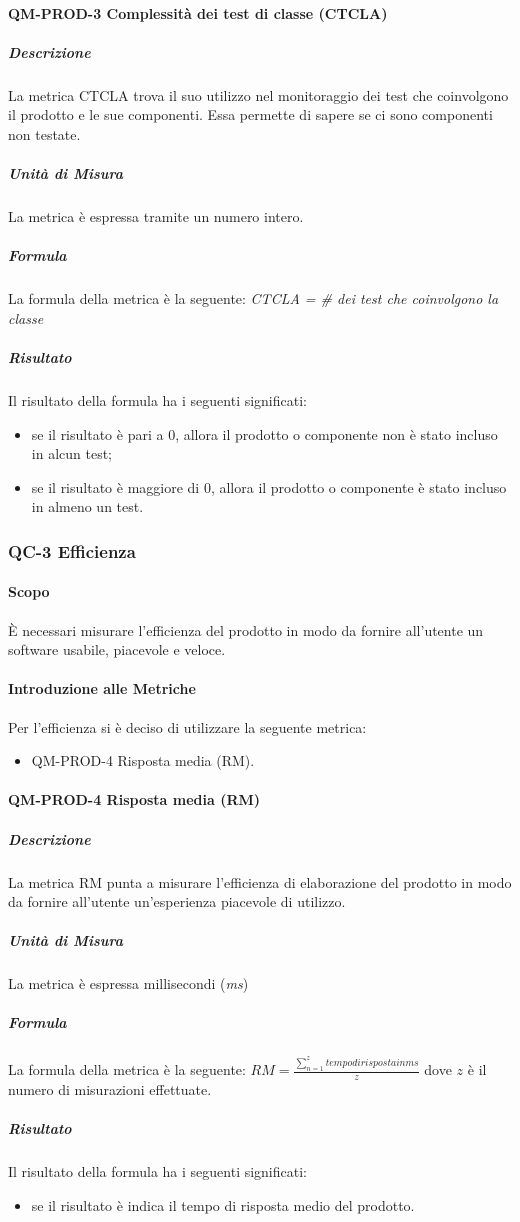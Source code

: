 			\paragraph{QM-PROD-3 Complessità dei test di classe (CTCLA)}
				\subparagraph{Descrizione}
					La metrica CTCLA trova il suo utilizzo nel monitoraggio dei test che coinvolgono il prodotto e le sue componenti. Essa permette di sapere se ci sono componenti non testate.
				\subparagraph{Unità di Misura}
					La metrica è espressa tramite un numero intero.
				\subparagraph{Formula}
					La formula della metrica è la seguente:
					\textit{CTCLA = \# dei test che coinvolgono la classe}
				\subparagraph{Risultato}
					Il risultato della formula ha i seguenti significati:
					\begin{itemize}
						\item se il risultato è pari a 0, allora il prodotto o componente non è stato incluso in alcun test;
						\item se il risultato è maggiore di 0, allora il prodotto o componente è stato incluso in almeno un test.
					\end{itemize}

		\subsubsection{QC-3 Efficienza}
			\paragraph{Scopo}
				È necessari misurare l'efficienza del prodotto in modo da fornire all'utente un software usabile, piacevole e veloce.
			\paragraph{Introduzione alle Metriche}
				Per l'efficienza si è deciso di utilizzare la seguente metrica:
				\begin{itemize}
					\item QM-PROD-4 Risposta media (RM).
				\end{itemize}
			\paragraph{QM-PROD-4 Risposta media (RM)}
				\subparagraph{Descrizione}
					La metrica RM punta a misurare l'efficienza di elaborazione del prodotto in modo da fornire all'utente un'esperienza piacevole di utilizzo.
				\subparagraph{Unità di Misura}
					La metrica è espressa millisecondi (\textit{ms})
				\subparagraph{Formula}
					La formula della metrica è la seguente:
					\(
						RM = \frac{\sum_{n=1}^{z} tempo di risposta in ms}{z}
					\)
					dove $z$ è il numero di misurazioni effettuate.
				\subparagraph{Risultato}
					Il risultato della formula ha i seguenti significati:
					\begin{itemize}
						\item se il risultato è indica il tempo di risposta medio del prodotto.
					\end{itemize}

